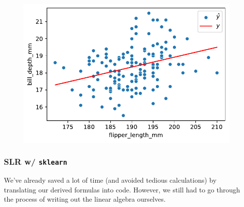 \documentclass[
  letterpaper,
  DIV=11,
  numbers=noendperiod]{scrreprt}
\newenvironment{Shaded}{\begin{snugshade}}{\end{snugshade}}
\newcommand{\CommentTok}[1]{\textcolor[rgb]{0.37,0.37,0.37}{#1}}
\newcommand{\NormalTok}[1]{\textcolor[rgb]{0.00,0.23,0.31}{#1}}
\newcommand{\OperatorTok}[1]{\textcolor[rgb]{0.37,0.37,0.37}{#1}}
\newcommand{\SpecialCharTok}[1]{\textcolor[rgb]{0.37,0.37,0.37}{#1}}
\newcommand{\StringTok}[1]{\textcolor[rgb]{0.13,0.47,0.30}{#1}}
\newcommand{\VerbatimStringTok}[1]{\textcolor[rgb]{0.13,0.47,0.30}{#1}}
\begin{document}
\begin{Shaded}
\end{Shaded}

\begin{figure}[H]

{\centering \includegraphics{gradient_descent/gradient_descent_files/figure-pdf/cell-7-output-1.pdf}

}

\end{figure}

\hypertarget{slr-w-sklearn}{%
\subsubsection{\texorpdfstring{SLR w/
\texttt{sklearn}}{SLR w/ sklearn}}\label{slr-w-sklearn}}

We've already saved a lot of time (and avoided tedious calculations) by
translating our derived formulas into code. However, we still had to go
through the process of writing out the linear algebra ourselves.
\end{document}

